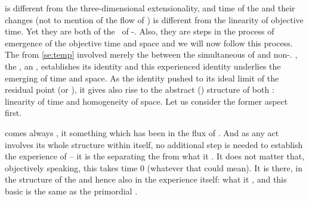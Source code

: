 is different from the three-dimensional {extensionality}, and
time of the  and their changes (not to mention  of
the flow of ) is different from the linearity of objective time.
Yet they are both  of the \nexus\ of -. Also,
they are steps in the process of emergence of the objective time and space and
we will now follow this process.  The  from \ref{se:temp}
involved merely the  between the simultaneous  of
 and non-.  , the 
,  an , establishes its identity and 
this experienced identity underlies the emerging  of time and
space. As the identity pushed to its ideal limit of the residual point (or
), it gives also rise to the abstract () structure
of both : linearity of time and homogeneity of space. Let us consider
the former aspect first.

\label{sub:time}
%
\pa {} comes always , it  something
which has  been  in the flux of
. And as any act involves its whole structure within itself, no
additional step is needed to establish the experience of  -- it
is the  separating the  from what it
. It does not matter that, objectively speaking, this
 takes time 0 (whatever that could mean). It is there, in the
structure of the  and hence also in the experience
itself:   what it , and this basic
 is the same as the primordial {}.

